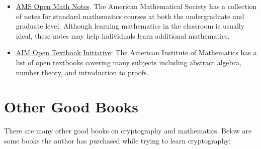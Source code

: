 \begin{itemize}
\item \href{https://www.ams.org/open-math-notes}{AMS Open Math Notes}.
    The American Mathematical Society has a collection of notes
    for standard mathematics courses at both the undergraduate
    and graduate level.
    Although learning mathematics in the classroom is usually ideal,
    these notes may help individuals learn additional
    mathematics.
\item \href{https://aimath.org/textbooks/approved-textbooks/}{AIM
        Open Textbook Initiative}:
    The American Institute of Mathematics has a list of open textbooks
    covering many subjects including abstract algebra, \gls{number theory},
    and introduction to proofs.
\end{itemize}



\section{Other Good Books}

There are many other good books on cryptography and mathematics.
Below are some books the author has purchased while trying
to learn cryptography:

